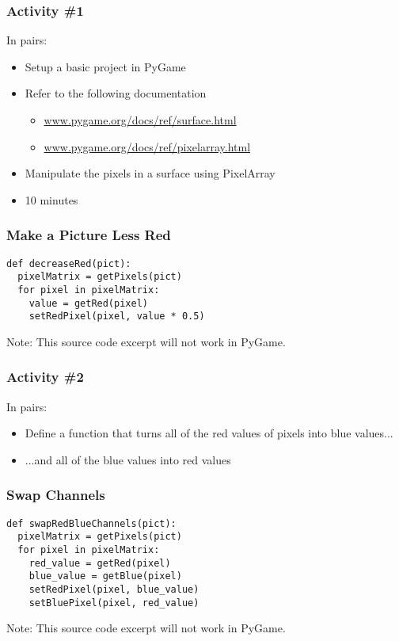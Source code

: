 \begin{frame}
	\frametitle{Activity \#1}
	
	In pairs:
	
	\vspace{2em}
	
	\begin{itemize}		
		\item Setup a basic project in PyGame
		\item Refer to the following documentation
		\begin{itemize}
			\item \url{www.pygame.org/docs/ref/surface.html}
			\item \url{www.pygame.org/docs/ref/pixelarray.html}
		\end{itemize}
		\item Manipulate the pixels in a surface using PixelArray
		\item 10 minutes
	\end{itemize}
\end{frame}

\begin{frame}[fragile]
	\frametitle{Make a Picture Less Red}
	
\begin{lstlisting}
def decreaseRed(pict):
  pixelMatrix = getPixels(pict)
  for pixel in pixelMatrix:
    value = getRed(pixel)
    setRedPixel(pixel, value * 0.5)
\end{lstlisting}

Note: This source code excerpt will not work in PyGame.

\end{frame}

\begin{frame}
	\frametitle{Activity \#2}
	
	In pairs:
	
	\vspace{2em}
	
	\begin{itemize}
		\item Define a function that turns all of the red values of pixels into blue values...
		\item ...and all of the blue values into red values
	\end{itemize}
\end{frame}

\begin{frame}[fragile]
	\frametitle{Swap Channels}
	
\begin{lstlisting}
def swapRedBlueChannels(pict):
  pixelMatrix = getPixels(pict)
  for pixel in pixelMatrix:
    red_value = getRed(pixel)
    blue_value = getBlue(pixel)
    setRedPixel(pixel, blue_value)
    setBluePixel(pixel, red_value)
\end{lstlisting}

Note: This source code excerpt will not work in PyGame.

\end{frame}

